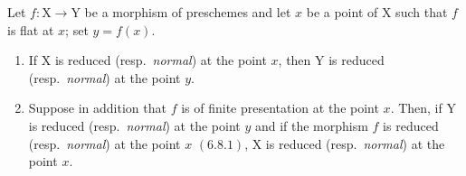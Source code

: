 \begin{proposition}[11.3.13]
\label{IV.11.3.13}
Let $f:\mathrm{X}\to\mathrm{Y}$ be a morphism of preschemes and let $x$ be a point of $\mathrm{X}$ such that $f$ is flat at $x$; set $y=f(x)$.
\begin{enumerate}[label=\emph{(\roman*)}]
  \item If $\mathrm{X}$ is reduced \textup{(resp.\ \emph{normal})} at the point $x$, then $\mathrm{Y}$ is reduced \textup{(resp.\ \emph{normal})} at the point $y$.
  \item Suppose in addition that $f$ is of finite presentation at the point $x$. Then, if $\mathrm{Y}$ is reduced \textup{(resp.\ \emph{normal})} at the point $y$ and if the morphism $f$ is reduced \textup{(resp.\ \emph{normal})} at the point $x$ $(6.8.1)$, $\mathrm{X}$ is reduced \textup{(resp.\ \emph{normal})} at the point $x$.
\end{enumerate}
\end{proposition}

